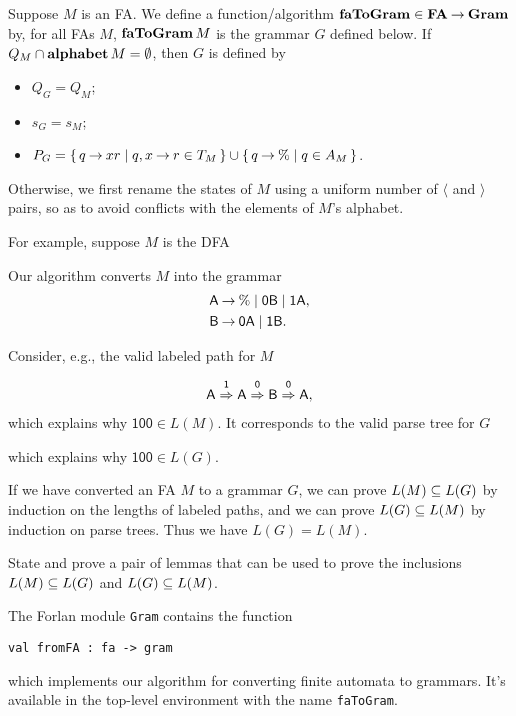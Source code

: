 Suppose $M$ is an FA. We define a function/algorithm $\faToGram\in
\index{grammar!faToGram@\texttt{faToGram}}%
\index{finite automaton!faToGram@\texttt{faToGram}}%
\FA\fun\Gram$ by, for all FAs $M$, $\mathbf{faToGram}\,M$ is the grammar
$G$ defined below. If $Q_M\cap\mathbf{alphabet}\,M=\emptyset$, then $G$ is
defined by
\begin{itemize}
\item $Q_G = Q_M$;

\item $s_G = s_M$;

\item $P_G = \{ \, q\mathbin{\to} xr \mid q,x\mathbin{\to} r\in T_M \, \} \cup
  \{ \, q\mathbin{\to}\% \mid q\in A_M \, \}$.
\end{itemize}
Otherwise, we first rename the states of $M$ using a uniform
number of $\langle$ and $\rangle$ pairs, so as to avoid conflicts
with the elements of $M$'s alphabet.

For example, suppose $M$ is the DFA
\begin{center}
  
\end{center}
Our algorithm converts $M$ into the grammar
\begin{align*}
  \mathsf{A} &\mathbin{\to} \% \mid \mathsf{0B} \mid \mathsf{1A} , \\
  \mathsf{B} &\mathbin{\to} \mathsf{0A} \mid \mathsf{1B} .
\end{align*}

Consider, e.g., the valid labeled path for $M$
\begin{gather*}
\mathsf{A}\stackrel{\strut\mathsf{1}}{\Rightarrow}\mathsf{A}\stackrel{\strut\mathsf{0}}{\Rightarrow}\mathsf{B}\stackrel{\strut\mathsf{0}}{\Rightarrow}\mathsf{A} ,
\end{gather*}
which explains why $\mathsf{100}\in L(M)$.  It corresponds to the
valid parse tree for $G$
\begin{center}

\end{center}
which explains why $\mathsf{100}\in L(G)$.

If we have converted an FA $M$ to a grammar $G$, we can prove
$L(M)\subseteq L(G)$ by induction on the lengths of labeled paths,
and we can prove $L(G)\subseteq L(M)$ by induction on parse trees.
Thus we have $L(G) = L(M)$.

\begin{exercise}
State and prove a pair of lemmas that can be used to prove
the inclusions $L(M)\subseteq L(G)$ and $L(G)\subseteq L(M)$.
\end{exercise}

The Forlan module \texttt{Gram} contains the function
\begin{verbatim}
val fromFA : fa -> gram
\end{verbatim}
which implements our algorithm for converting finite automata to
grammars.  It's available in the top-level environment with the name
\texttt{faToGram}.

